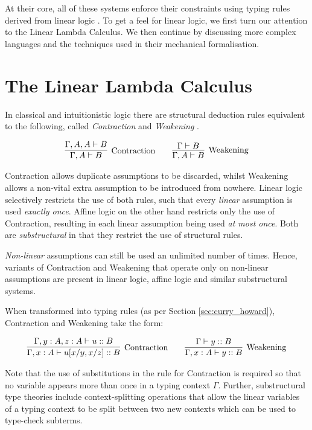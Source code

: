 \documentclass[]{unswthesis}
\let\i\textit
\begin{document}
At their core, all of these systems enforce their constraints using typing rules derived from linear logic \cite{girard87}. To get a feel for linear logic, we first turn our attention to the Linear Lambda Calculus. We then continue by discussing more complex languages and the techniques used in their mechanical formalisation.

\section{The Linear Lambda Calculus}

In classical and intuitionistic logic there are structural deduction rules equivalent to the following, called \i{Contraction} and \i{Weakening} \cite{wadler90, wadler93}.

\begin{eqnarray*}
\infer[\text{Contraction}]{\Gamma, A \vdash B}{
	\Gamma, A, A \vdash B
}
\qquad
\infer[\text{Weakening}]{\Gamma, A \vdash B}{
    \Gamma \vdash B
}
\end{eqnarray*}

Contraction allows duplicate assumptions to be discarded, whilst Weakening allows a non-vital extra assumption to be introduced from nowhere. Linear logic \cite{girard87} selectively restricts the use of both rules, such that every \i{linear} assumption is used \i{exactly once}. Affine logic on the other hand restricts only the use of Contraction, resulting in each linear assumption being used \i{at most once}. Both are \i{substructural} in that they restrict the use of structural rules.

\i{Non-linear} assumptions can still be used an unlimited number of times. Hence, variants of Contraction and Weakening that operate only on non-linear assumptions are present in linear logic, affine logic and similar substructural systems.

When transformed into typing rules (as per Section \ref{sec:curry_howard}), Contraction and Weakening take the form:

\begin{eqnarray*}
\infer[\text{Contraction}]{\Gamma, x : A \vdash u[x/y, x/z] :: B}{
	\Gamma, y : A, z : A \vdash u :: B
}
\qquad
\infer[\text{Weakening}]{\Gamma, x : A \vdash y :: B}{
    \Gamma\vdash y :: B
}
\end{eqnarray*}

Note that the use of substitutions in the rule for Contraction is required so that no variable appears more than once in a typing context $\Gamma$. Further, substructural type theories include context-splitting operations that allow the linear variables of a typing context to be split between two new contexts which can be used to type-check subterms.
\end{document}
